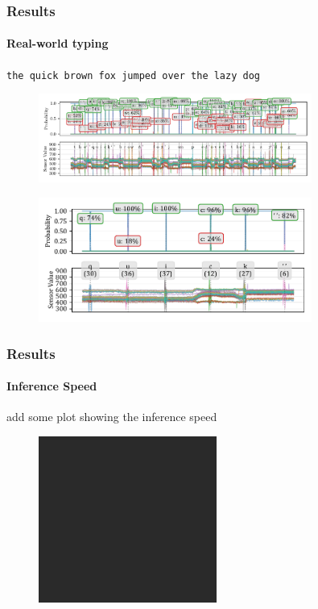 \documentclass[xcolor={svgnames,table},10pt,fleqn]{beamer}
\begin{document}
\begin{frame}
    \frametitle{Results}
    \framesubtitle{Real-world typing}
    \centering
    \texttt{the quick brown fox jumped over the lazy dog}
    \begin{figure}[h]
        \centering
        \includegraphics[width=0.8\textwidth]{05_pred_plot_0000_to_9420_full_text.pdf}
    \end{figure}
    \begin{figure}[h]
        \centering
        \includegraphics[width=0.8\textwidth]{05_pred_plot_0900_to_1800_quick.pdf}
    \end{figure}
\end{frame}

\begin{frame}
    \frametitle{Results}
    \framesubtitle{Inference Speed}
    add some plot showing the inference speed
    \begin{figure}[h]
        \centering
        \includegraphics[width=\textwidth]{todo}
    \end{figure}
\end{frame}
\end{document}
